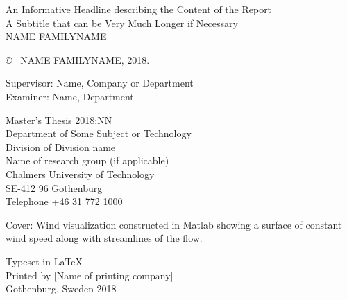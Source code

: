 \newpage
\thispagestyle{plain}
\vspace*{4.5cm}
An Informative Headline describing the Content of the Report\\
A Subtitle that can be Very Much Longer if Necessary\\
NAME FAMILYNAME \setlength{\parskip}{1cm}

\copyright ~ NAME FAMILYNAME, 2018. \setlength{\parskip}{1cm}

Supervisor: Name, Company or Department\\
Examiner: Name, Department \setlength{\parskip}{1cm}

Master's Thesis 2018:NN\\	%
Department of Some Subject or Technology\\
Division of Division name\\
Name of research group (if applicable)\\
Chalmers University of Technology\\
SE-412 96 Gothenburg\\
Telephone +46 31 772 1000 \setlength{\parskip}{0.5cm}

\vfill
Cover: Wind visualization constructed in Matlab showing a surface of constant wind speed along with streamlines of the flow. \setlength{\parskip}{0.5cm}

Typeset in \LaTeX \\
Printed by [Name of printing company]\\
Gothenburg, Sweden 2018
